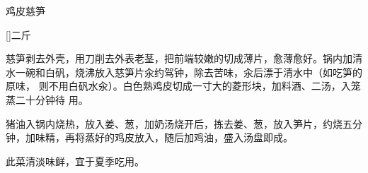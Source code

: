 \begin{recipe}{鸡皮慈笋}

\ingredients

[\footnotemark]{二斤}

\preparation

\step 慈笋剥去外壳，用刀削去外表老茎，把前端较嫩的切成薄片，愈薄愈好。锅内加清
水一碗和白矾，烧沸放入慈笋片汆约驾钟，除去苦味，汆后漂于清水中（如吃笋的原味，
则不用白矾水汆）。白色熟鸡皮切成一寸大的菱形块，加料酒、二汤，入笼蒸二十分钟待
用。

\step 猪油入锅内烧热，放入姜、葱，加奶汤烧开后，拣去姜、葱，放入笋片，约烧五分
钟，加味精，再将蒸好的鸡皮放入，随后加鸡油，盛入汤盘即成。

\features

此菜清淡味鲜，宜于夏季吃用。


\end{recipe}

